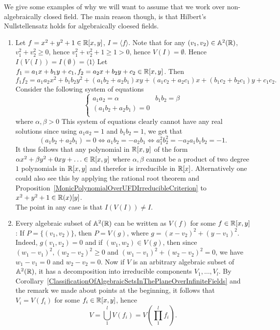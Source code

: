 \begin{example}
    We give some examples of why we will want to assume that we work over non-algebraically closed field. The main reason though, is that Hilbert's Nullstellensatz holds for algebraically cloesed fields.  
    \begin{enumerate}
    \item
        Let $f = x^2+y^2+1\in \mathbb{R}[x,y]$, $I=\langle f\rangle$.
        Note that for any $(v_1,v_2)\in \mathbb{A}^2(\mathbb{R})$, $v_1^2+v_2^2\geq 0$, hence $v_1^2+v_2^2+1\geq 1 >0$, hence $V(I)= \emptyset$. Hence $I(V(I))=I(\emptyset) = \langle 1 \rangle$
        Let $f_1=a_1x+b_1y+c_1,f_2=a_2x+b_2y+c_2\in \mathbb{R}[x,y]$. Then 
        $$f_1f_2=a_1a_2x^2+b_1b_2y^2+(a_1b_2+a_2b_1)xy+(a_1c_2+a_2c_1)x+(b_1c_2+b_2c_1)y+c_1c_2.$$
        Consider the following system of equations
        $$\begin{cases}
        a_1a_2 = \alpha & b_1b_2 = \beta\\
        (a_1b_2+a_2b_1) = 0\\  
        \end{cases}$$
        where $\alpha, \beta > 0$
        This system of equations clearly cannot have any real solutions since using $a_1a_2 = 1$ and $ b_1b_2 = 1$, we get that
        $$(a_1b_2+a_2b_1) = 0\iff a_1b_2 = -a_2b_1 \iff a_1^2b_2^2 = -a_2a_1b_1b_2 = -1.$$
        It thus follows that any polynomial in $\mathbb{R}[x,y]$ of the form $\alpha x^2+\beta y^2 + 0xy +\dots \in \mathbb{R}[x,y]$ where $\alpha,\beta$ cannot be a product of two degree $1$ polynomials in $\mathbb{R}[x,y]$ and therefor is irreducible in $\mathbb{R}[x]$. Alternatively one could also see this by applying the rational root theorem and Proposition~\ref{MonicPolynomialOverUFDIrreducibleCriterion} to $x^2+y^2+1\in \mathbb{R}(x)[y]$. \\
        The point in any case is that $I(V(I))\neq I$.
        \item Every algebraic subset of $\mathbb{A}^2(\mathbb{R})$ can be written as $V(f)$ for some $f\in \mathbb{R}[x,y]$: If $P=\{(v_1,v_2)\}$, then $P=V(g)$, where $g = (x-v_2)^2+(y-v_1)^2$. Indeed, $g(v_1,v_2)=0$ and if $(w_1,w_2)\in V(g)$, then since $(w_1-v_1)^2,(w_2-v_2)^2\geq 0$ and $(w_1-v_1)^2+(w_2-v_2)^2 =0$, we have $w_1-v_1=0$ and $w_2-v_2=0$. Now if $V$ is an arbitrary algebraic subset of $\mathbb{A}^2(\mathbb{R})$, it has a decomposition into irreducible components $V_1,\dots,V_l$. By Corollary~\ref{ClassificationOfAlgebraicSetsInThePlaneOverInfiniteFields} and the remark we made about points at the beginning, it follows that $V_i = V(f_i)$ for some $f_i\in \mathbb{R}[x,y]$, hence 
        $$V = \bigcup_1^l V(f_i) = V\left(\prod_1^l f_i\right).$$
        \end{enumerate}
\end{example}
